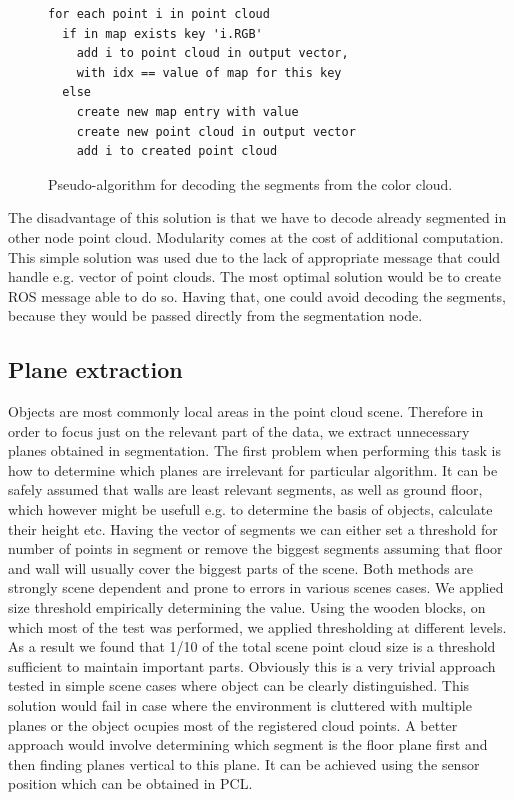 \documentclass[fontsize=12pt]{article}
\begin{document}
\begin{figure}[H]
\begin{center}
\begin{lstlisting}
for each point i in point cloud
  if in map exists key 'i.RGB'
    add i to point cloud in output vector,
    with idx == value of map for this key
  else
    create new map entry with value
    create new point cloud in output vector
    add i to created point cloud
\end{lstlisting}
\caption{Pseudo-algorithm for decoding the segments from the color cloud.}
\label{code:algo}
\end{center}
\end{figure}

The disadvantage of this solution is that we have to decode already segmented in other node point cloud. Modularity comes at the cost of additional computation. This simple solution was used due to the lack of appropriate message that could handle e.g. vector of point clouds. The most optimal solution would be to create ROS message able to do so. Having that, one could avoid decoding the segments, because they would be passed directly from the segmentation node.

\subsection{Plane extraction}
Objects are most commonly local areas in the point cloud scene. Therefore in order to focus just on the relevant part of the data, we extract unnecessary planes obtained in segmentation. The first problem when performing this task is how to determine which planes are irrelevant for particular algorithm. It can be safely assumed that walls are least relevant segments, as well as ground floor, which however might be usefull e.g. to determine the basis of objects, calculate their height etc.
\newline
\indent Having the vector of segments we can either set a threshold for number of points in segment or remove the biggest segments assuming that floor and wall will usually cover the biggest parts of the scene. Both methods are strongly scene dependent and prone to errors in various scenes cases. We applied size threshold empirically determining the value. Using the wooden blocks, on which most of the test was performed, we applied thresholding at different levels. As a result we found that 1/10 of the total scene point cloud size is a	 threshold sufficient to maintain important parts.
\newline
\indent Obviously this is a very trivial approach tested in simple scene cases where object can be clearly distinguished. This solution would fail in case where the environment is cluttered with multiple planes or the object ocupies most of the registered cloud points. A better approach would involve determining which segment is the floor plane first and then finding planes vertical to this plane. It can be achieved using the sensor position which can be obtained in PCL. 
\end{document}

